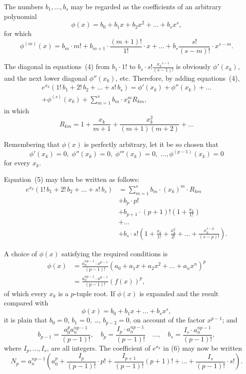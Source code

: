 \documentclass[a4paper,12pt]{book}[2004/02/16]
\providecommand{\colorbox}[2]{#2}
\newcommand{\correction}[2]{\colorbox{corr}{#1}}
\providecommand{\hyperlink}[2]{#2}
\providecommand{\hypertarget}[2]{#2}
\theoremstyle{ilemma}
\theoremstyle{itheorem}
\theoremstyle{iother}
\theoremstyle{icorollary}
\theoremstyle{numcorollary}
\theoremstyle{idefinition}
\begin{document}
The numbers $b_1,\ldots,b_{\text{\correction{$s$}{$n$}}}$ may be regarded as the coefficients of an
arbitrary polynomial
\[
  \phi(x)=b_0+b_1x+b_2x^2+\ldots+b_s x^s,
\]
for which
\[
  \phi^{(m)}(x)=b_m\cdot m!+b_{m+1}\cdot\frac{(m+1)!}{1!}\cdot x
  + \ldots + b_s\frac{s!}{(s-m)!}\cdot x^{s-m}.
\]

The diagonal in equations~\hyperlink{eq4p26}{(4)} from $b_1\cdot1!$ to $b_s\cdot
s!\frac{{x_k}^{s-1}}{(s-1)\text{\correction{$!$}{}}}$ is obviously $\phi'(x_k)$, and the next
lower diagonal $\phi''(x_k)$, etc.  Therefore, by adding equations~\hyperlink{eq4p26}{(4)},
\hypertarget{eq5p26}{\begin{multline*}
  e^{x_k}(1!\,b_1+2!\,b_2+\ldots+s!\,b_s) = \phi'(x_k)+\phi''(x_k)+\ldots
\\
  +\phi^{(s)}(x_k)+\sum_{m=1}^s b_m\cdot x_k^mR_{km},
\tag{5}
\end{multline*}}
in which
\[
  R_{km} = 1 + \frac{x_k}{m+1} + \frac{x_k^2}{(m+1)(m+2)}+ \ldots
\]

Remembering that $\phi(x)$ is perfectly arbitrary, let it be so chosen
that
\[
  \phi'(x_k) = 0,\; \phi''(x_k)=0,\; \phi'''(x_k)=0,
  \; \ldots, \phi^{(p-1)}(x_k)=0
\]
for every $x_k$.

Equation~\hyperlink{eq5p26}{(5)} may then be written as follows:
\hypertarget{eq6p27}{\begin{align*}
  e^{x_k}(1!\,b_1 + 2!\,b_2 + \ldots + s!\,b_s)
  &= \sum_{m=1}^s b_m \cdot (x_k)^m \cdot R_{\text{\correction{$km$}{$k,m$}}}
\\
  &+ b_p \cdot p! \\
  &+ b_{p+1} \cdot (p+1)! \left(1+\frac{x_k}{1!} \right) \\
  &+\ldots \\
\tag{6}
  &+ b_s \cdot s! \left(1 + \frac{x_k}{1!} + \frac{x^2_k}{2!} + \ldots
                     + \frac{x_k^{s-p}}{(s-p)!} \right).
\end{align*}}

A choice of $\phi(x)$ satisfying the required conditions is
\begin{align*}
  \phi(x) &= \frac{a_n^{np-1} \cdot x^{p-1}}{(p-1)!}
             (a_0 + a_1 x + a_2 x^2 + \ldots + a_n x^n)^p
\\
  &= \frac{a_n^{np-1} \cdot x^{p-1}}{(p-1)!} (f(x))^p,
\end{align*}
of which every $x_k$ is a $p$-tuple root. If $\phi(x)$ is expanded and
the result compared with
\[
  \phi(x) = b_0 + b_1 x + \ldots + b_s x^s,
\]
it is plain that $b_0=0$, $b_1=0$, \ldots, $b_{p-2}=0$, on account of
the factor $x^{p-1}$; and
\[
  b_{p-1} = \frac{a_0^p a_n^{np-1}}{(p-1)!}, \quad
  b_p = \frac{I_p \cdot a_n^{np-1}}{(p-1)!} \quad \ldots, \quad
  b_s = \frac{I_s \cdot a_n^{np-1}}{(p-1)!},
\]
where $I_p,\ldots,I_s$, are all integers. The coefficient of $e^{x_k}$ in
\hyperlink{eq6p27}{(6)} may now be written
\[
  N_p = a_n^{np-1} \left(a_0^p +
  \frac{I_p}{(p-1)!}\cdot p! +
  \frac{I_{p+1}}{(p-1)!}(p+1)! +
  \ldots +
  \frac{I_s}{(p-1)!} \cdot s! \right)\text{\correction{.}{}}
\]
\end{document}
